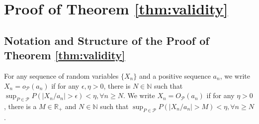 \documentclass[letterpaper,11pt]{article}
\theoremstyle{myplain}
\theoremstyle{mydefinition}
\theoremstyle{myremark}
\newcommand{\R}{\mathbb{R}}
\newcommand{\cP}{\mathcal{P}}
\newcommand{\thetnprime}{(\theta_n +\rho /\sqrt{n} B^d)\cap \Theta}
\numberwithin{equation}{section}
\numberwithin{figure}{section}
\begin{document}
\begin{appendices}
\begin{enumerate}
\end{enumerate}

\clearpage
\section{Proof of Theorem \ref{thm:validity}} \label{sec:app_A}

\subsection{Notation and Structure of the Proof of Theorem \ref{thm:validity}}\label{subsec:notation}
For any sequence of random variables $\{X_n\}$ and a positive sequence $a_n$, we write $X_n=o_{\mathcal P}(a_n)$ if for any $\epsilon,\eta>0$, there is $N\in\mathbb N$ such that $\sup_{P\in\mathcal P}P(|X_n/a_n|>\epsilon)<\eta,\forall n\ge N$. We write $X_n=O_{\mathcal P}(a_n)$ if for any $\eta>0$, there is a $M\in\mathbb R_+$ and $N\in\mathbb N$ such that $\sup_{P\in\mathcal P}P(|X_n/a_n|>M)<\eta,\forall n\ge N$. 

\setcounter{table}{0} 
\begin{table}[htbp]

\advance\leftskip-1.5cm
\parbox{20cm}{\caption[Table Notation]{Important notation. Here $(P_n,\theta_n)\in \{(P,\theta):P \in \cP,\theta \in \Theta_I(P)\}$ is a subsequence as defined in \eqref{eq:cover3}-\eqref{eq:pi_def} below,  $\theta_n^\prime \in \thetnprime$, $B^d = \{x \in \R^d:|x_i| \le 1, i=1,\dots,d\}$, $B^d_{n,\rho}\equiv \frac{\sqrt n}{\rho }(\Theta-\theta_n)\cap B^d$, $\mathfrak B^d_\rho=\lim_{n\to\infty}B^d_{n,\rho}$, and $\lambda\in\R^d$.}\label{table:notation}} \smallskip



\resizebox{20cm}{!}{

}
\end{table}
\end{appendices}
\end{document}
